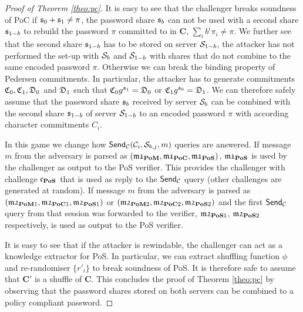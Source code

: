 \begin{proof}[Proof of Theorem \ref{theo:pc}]
It is easy to see that the challenger breaks soundness of \ac{PoC} if $\mathfrak{s}_0+\mathfrak{s}_1\not=\pi$, \ie the password share $\mathfrak{s}_b$ can not be used with a second share $\mathfrak{s}_{1-b}$ to rebuild the password $\pi$ committed to in $\bm C$, \ie $\sum_i b^i\pi_i\not=\pi$.
We further see that the second share $\mathfrak{s}_{1-b}$ has to be stored on server $\mathcal{S}_{1-b}$, \ie the attacker has not performed the set-up with $\mathcal{S}_b$ and $\mathcal{S}_{1-b}$ with shares that do not combine to the same encoded password $\pi$.
Otherwise we can break the binding property of Pedersen commitments.
In particular, the attacker has to generate commitments $\mathfrak{C}_0, \mathfrak{C}_1, \mathfrak{D}_0$ and $\mathfrak{D}_{1}$ such that $\mathfrak{C}_0g^{\mathfrak{s}_1}=\mathfrak{D}_0$ or $\mathfrak{C}_1g^{\mathfrak{s}_0}=\mathfrak{D}_1$.
We can therefore safely assume that the password share $\mathfrak{s}_b$ received by server $\mathcal{S}_b$ can be combined with the second share $\mathfrak{s}_{1-b}$ of server $\mathcal{S}_{1-b}$ to an encoded password $\pi$ with according character commitments $C_i$.


In this game we change how $\mathsf{Send}_\mathcal{C}(\mathcal{C}_i, \mathcal{S}_{b,j}, m)$ queries are answered.
If message $m$ from the adversary is parsed as $(\mathfrak{m1}_\mathsf{\bf PoM},\mathfrak{m1}_\mathsf{\bf PoC},\mathfrak{m1}_\mathsf{\bf PoS})$, $\mathfrak{m1}_\mathsf{\bf PoS}$ is used by the challenger as output to the \ac{PoS} verifier.
This provides the challenger with challenge $\mathfrak{c}_\mathsf{\bf PoS}$ that is used as reply to the $\mathsf{Send}_\mathcal{C}$ query (other challenges are generated at random).
If message $m$ from the adversary is parsed as $(\mathfrak{m2}_{\mathsf{\bf PoM}1},\mathfrak{m2}_{\mathsf{\bf PoC}1},\mathfrak{m2}_{\mathsf{\bf PoS}1})$ or $(\mathfrak{m2}_{\mathsf{\bf PoM}2},\mathfrak{m2}_{\mathsf{\bf PoC}2},\mathfrak{m2}_{\mathsf{\bf PoS}2})$ and the first $\mathsf{Send}_\mathcal{C}$ query from that session was forwarded to the verifier, $\mathfrak{m2}_{\mathsf{\bf PoS}1}$, $\mathfrak{m2}_{\mathsf{\bf PoS}2}$ respectively, is used as output to the \ac{PoS} verifier.

It is easy to see that if the attacker is rewindable, the challenger can act as a knowledge extractor for \ac{PoS}.
In particular, we can extract shuffling function $\phi$ and re-randomiser $\{r'_i\}$ to break soundness of \ac{PoS}.
It is therefore safe to assume that $\bm C'$ is a shuffle of $\bm C$.
This concludes the proof of Theorem \ref{theo:pc} by observing that the password shares stored on both servers can be combined to a policy compliant password.
\end{proof}



